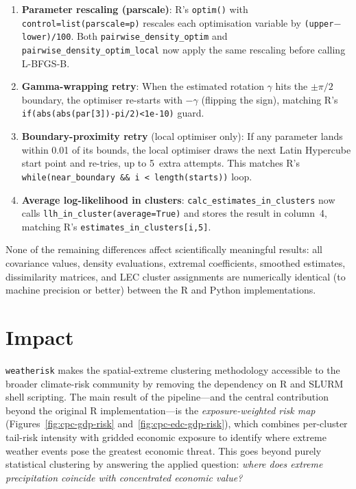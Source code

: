 \documentclass[a4paper]{elsarticle}
\begin{document}
\begin{enumerate}
\item \textbf{Parameter rescaling (parscale)}:
  R's \texttt{optim()} with \texttt{control=list(parscale=p)}
  rescales each optimisation variable by \texttt{(upper$-$lower)/100}.
  Both \texttt{pairwise\_density\_optim} and
  \texttt{pairwise\_density\_optim\_local} now apply the same
  rescaling before calling L-BFGS-B.

\item \textbf{Gamma-wrapping retry}:
  When the estimated rotation $\gamma$ hits the $\pm\pi/2$ boundary,
  the optimiser re-starts with $-\gamma$ (flipping the sign),
  matching R's \texttt{if(abs(abs(par[3])-pi/2)<1e-10)} guard.

\item \textbf{Boundary-proximity retry} (local optimiser only):
  If any parameter lands within 0.01 of its bounds, the local
  optimiser draws the next Latin Hypercube start point and
  re-tries, up to 5~extra attempts.
  This matches R's \texttt{while(near\_boundary \&\& i < length(starts))} loop.

\item \textbf{Average log-likelihood in clusters}:
  \texttt{calc\_estimates\_in\_clusters} now calls
  \texttt{llh\_in\_cluster(average=True)} and stores the result
  in column~4, matching R's \texttt{estimates\_in\_clusters[i,5]}.
\end{enumerate}

None of the remaining differences affect scientifically meaningful results:
all covariance values, density evaluations, extremal coefficients,
smoothed estimates, dissimilarity matrices, and LEC cluster assignments
are numerically identical (to machine precision or better) between
the R and Python implementations.

\section{Impact}
\label{sec:impact}

\texttt{weatherisk} makes the spatial-extreme clustering methodology
accessible to the broader climate-risk community by removing the
dependency on R and SLURM shell scripting.
The main result of the pipeline---and the central contribution beyond
the original R implementation---is the \emph{exposure-weighted risk map}
(Figures~\ref{fig:cpc-gdp-risk} and~\ref{fig:cpc-edc-gdp-risk}),
which combines per-cluster tail-risk intensity with gridded economic
exposure to identify where extreme weather events pose the greatest
economic threat.  This goes beyond purely statistical clustering by
answering the applied question: \emph{where does extreme precipitation
coincide with concentrated economic value?}
\end{document}
